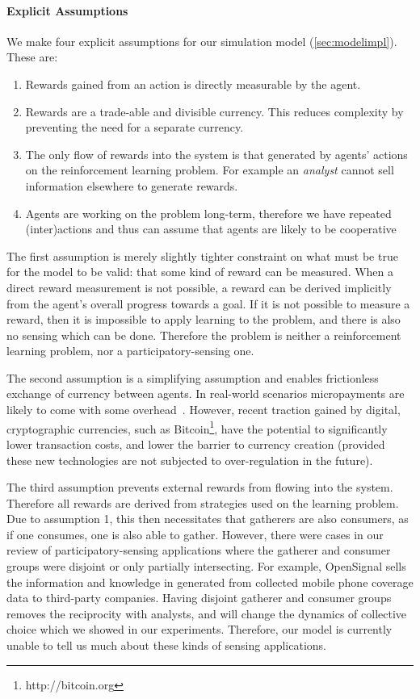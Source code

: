 \paragraph{Explicit Assumptions}
We make four explicit assumptions for our simulation model (\autoref{sec:modelimpl}). These are:
\begin{enumerate}
\item Rewards gained from an action is directly measurable by the agent.
\item Rewards are a trade-able and divisible currency. This reduces complexity by preventing the need for a separate currency.
\item The only flow of rewards into the system is that generated by agents' actions on the reinforcement learning problem. For example an \emph{analyst} cannot sell information elsewhere to generate rewards.
\item Agents are working on the problem long-term, therefore we have repeated (inter)actions and thus can assume that agents are likely to be cooperative
\end{enumerate}

The first assumption is merely slightly tighter constraint on what must be true
for the model to be valid: that some kind of reward can be measured. When a
direct reward measurement is not possible, a reward can be derived implicitly
from the agent's overall progress towards a goal. If it is not possible to
measure a reward, then it is impossible to apply learning to the problem, and
there is also no sensing which can be done. Therefore the problem is neither a
reinforcement learning problem, nor a participatory-sensing one.

The second assumption is a simplifying assumption and enables frictionless
exchange of currency between agents. In real-world scenarios micropayments are
likely to come with some overhead~\citep{papaefstathiou2004}. However, recent
traction gained by digital, cryptographic currencies, such as Bitcoin\footnote{http://bitcoin.org}, have
the potential to significantly lower transaction costs, and lower the barrier
to currency creation (provided these new technologies are not subjected to
over-regulation in the future).

The third assumption prevents external rewards from flowing into the system.
Therefore all rewards are derived from strategies used on the learning
problem. Due to assumption 1, this then necessitates that gatherers are also
consumers, as if one consumes, one is also able to gather. However, there were
cases in our review of participatory-sensing applications where the gatherer
and consumer groups were disjoint or only partially intersecting. For example,
OpenSignal sells the information and knowledge in generated from collected
mobile phone coverage data to third-party companies. Having disjoint gatherer
and consumer groups removes the reciprocity with analysts, and will change the
dynamics of collective choice which we showed in our experiments. Therefore,
our model is currently unable to tell us much about these kinds of sensing
applications.

